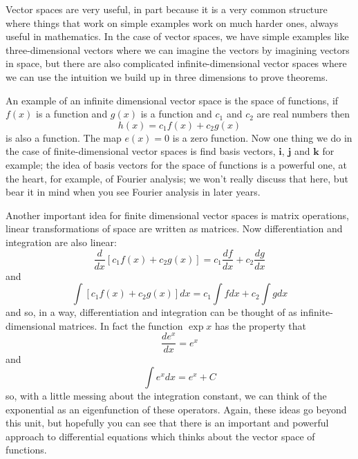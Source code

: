 \documentclass[12pt]{article}
\begin{document}
Vector spaces are very useful, in part because it is a very common
structure where things that work on simple examples work on much
harder ones, always useful in mathematics. In the case of vector
spaces, we have simple examples like three-dimensional vectors where
we can imagine the vectors by imagining vectors in space, but there
are also complicated infinite-dimensional vector spaces where we can
use the intuition we build up in three dimensions to prove theorems.

An example of an infinite dimensional vector space is the space of
functions, if $f(x)$ is a function and $g(x)$ is a function and $c_1$
and $c_2$ are real numbers then
\begin{equation}
  h(x)=c_1f(x)+c_2g(x)
\end{equation}
is also a function. The map $e(x)=0$ is a zero function. Now one thing
we do in the case of finite-dimensional vector spaces is find basis
vectors, $\textbf{i}$, $\textbf{j}$ and $\textbf{k}$ for example; the
idea of basis vectors for the space of functions is a powerful one, at
the heart, for example, of Fourier analysis; we won't really discuss
that here, but bear it in mind when you see Fourier analysis in later
years.


Another important idea for finite dimensional vector spaces is
matrix operations, linear transformations of space are written as
matrices. Now differentiation and integration are also linear:
\begin{equation}
  \frac{d}{dx}[c_1f(x)+c_2g(x)]=c_1\frac{df}{dx}+c_2\frac{dg}{dx}
\end{equation}
and
\begin{equation}
  \int[c_1f(x)+c_2g(x)]dx=c_1\int f dx+c_2\int g dx
\end{equation}
and so, in a way, differentiation and integration can be thought of as
infinite-dimensional matrices. In fact the function $\exp{x}$ has the
property that
\begin{equation}
  \frac{de^x}{dx}=e^x
\end{equation}
and
\begin{equation}
  \int e^x dx = e^x+C
\end{equation}
so, with a little messing about the integration constant, we can think
of the exponential as an eigenfunction of these operators. Again,
these ideas go beyond this unit, but hopefully you can see that there
is an important and powerful approach to differential equations which
thinks about the vector space of functions.
\end{document}
